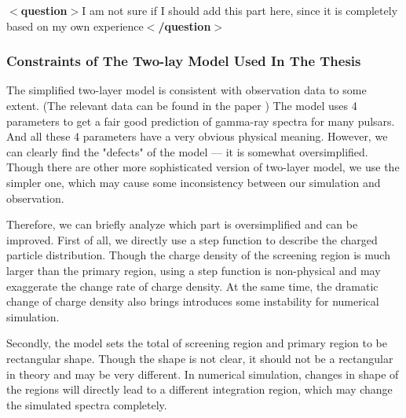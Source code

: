 \documentclass[12pt]{report}
\newcommand{\question}[1]{
  $<$\textbf{question}$>$#1$<$\textbf{/question}$>$
}
\begin{document}
      \question{I am not sure if I should add this part here, since it is completely based on 
        my own experience}
      \subsubsection{Constraints of The Two-lay Model Used In The Thesis} 
        The simplified two-layer model is consistent with observation data to some extent. 
        (The relevant data can be found in the paper 
        \href{http://iopscience.iop.org/article/10.1088/0004-637X/720/1/178/pdf}
        {})
        The model uses 4 parameters to get a fair good prediction of gamma-ray spectra for many 
        pulsars. And all these 4 parameters have a very obvious physical meaning. 
        However, we can clearly find the "defects" of the model --- it is somewhat oversimplified. 
        Though there are other more sophisticated version of two-layer model, we use the simpler one, 
        which may cause some inconsistency between our simulation and observation. 

        Therefore, we can briefly analyze which part is oversimplified and can be improved. 
        First of all, we directly use a step function to describe the charged particle distribution. 
        Though the charge density of the screening region is much larger than the primary region, using 
        a step function is non-physical and may exaggerate the change rate of charge density. At the 
        same time, the dramatic change of charge density also brings introduces some instability for 
        numerical simulation. 

        Secondly, the model sets the total of screening region and primary region to be rectangular shape. 
        Though the shape is not clear, it should not be a rectangular in theory and may be very different.
        In numerical simulation, changes in shape of the regions will directly lead to a different 
        integration region, which may change the simulated spectra completely.
\end{document}
